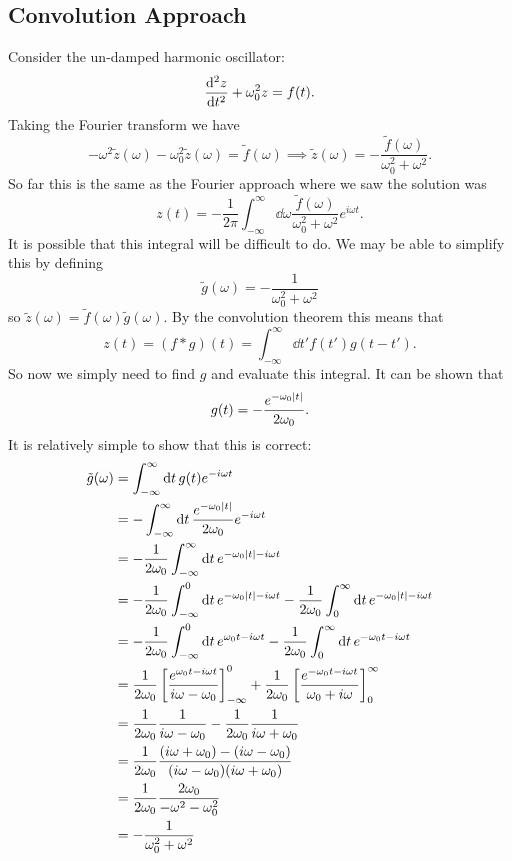 \documentclass[a4paper]{article}
\newcommand{\convolution}{\mathbin{*}}
\begin{document}
    \subsection{Convolution Approach}\label{sec:convolution approach}
    Consider the un-damped harmonic oscillator:
    \[\dv[2]{z}{t} + \omega_0^2z = f(t).\]
    Taking the Fourier transform we have
    \[-\omega^2\tilde{z}(\omega) - \omega_0^2\tilde{z}(\omega) = \tilde{f}(\omega) \implies \tilde{z}(\omega) = -\frac{\tilde{f}(\omega)}{\omega_0^2 + \omega^2}.\]
    So far this is the same as the Fourier approach where we saw the solution was
    \[z(t) = -\frac{1}{2\pi}\int_{-\infty}^{\infty} \dd{\omega} \frac{\tilde{f}(\omega)}{\omega_0^2 + \omega^2}e^{i\omega t}.\]
    It is possible that this integral will be difficult to do.
    We may be able to simplify this by defining
    \[\tilde{g}(\omega) = -\frac{1}{\omega_0^2 + \omega^2}\]
    so \(\tilde{z}(\omega) = \tilde{f}(\omega)\tilde{g}(\omega)\).
    By the convolution theorem this means that
    \[z(t) = (f\convolution g)(t) = \int_{-\infty}^{\infty} \dd{t'}f(t')g(t - t').\]
    So now we simply need to find \(g\) and evaluate this integral.
    It can be shown that
    \[g(t) = -\frac{e^{-\omega_0\abs{t}}}{2\omega_0}.\]
    It is relatively simple to show that this is correct:
    \begin{align*}
        \tilde{g}(\omega) &= \int_{-\infty}^{\infty} \dd{t} g(t) e^{-i\omega t}\\
        &= -\int_{-\infty}^{\infty} \dd{t} \frac{e^{-\omega_0\abs{t}}}{2\omega_0} e^{-i\omega t}\\
        &= -\frac{1}{2\omega_0}\int_{-\infty}^{\infty} \dd{t} e^{-\omega_0\abs{t} - i\omega t}\\
        &= -\frac{1}{2\omega_0}\int_{-\infty}^{0} \dd{t} e^{-\omega_0\abs{t} - i\omega t} -\frac{1}{2\omega_0} \int_{0}^{\infty} \dd{t} e^{-\omega_0\abs{t} - i\omega t}\\
        &= -\frac{1}{2\omega_0}\int_{-\infty}^{0} \dd{t} e^{\omega_0t - i\omega t} - \frac{1}{2\omega_0}\int_{0}^{\infty} \dd{t} e^{-\omega_0 t - i\omega t}\\
        &= \frac{1}{2\omega_0}\left[\frac{e^{\omega_0 t - i\omega t}}{i\omega - \omega_0}\right]_{-\infty}^{0} + \frac{1}{2\omega_0}\left[\frac{e^{-\omega_0 t - i\omega t}}{\omega_0 + i\omega}\right]_0^{\infty}\\
        &= \frac{1}{2\omega_0}\frac{1}{i\omega - \omega_0} - \frac{1}{2\omega_0}\frac{1}{i\omega + \omega_0}\\
        &= \frac{1}{2\omega_0}\frac{(i\omega + \omega_0) - (i\omega - \omega_0)}{(i\omega - \omega_0)(i\omega + \omega_0)}\\
        &= \frac{1}{2\omega_0}\frac{2\omega_0}{-\omega^2 - \omega_0^2}\\
        &= -\frac{1}{\omega_0^2 + \omega^2}
    \end{align*}
\end{document}
